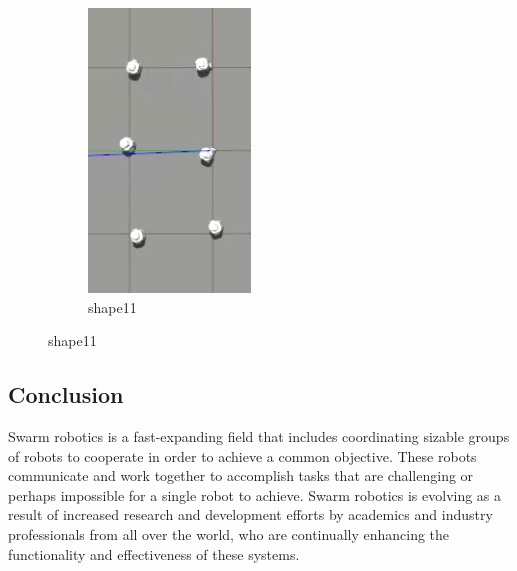 \documentclass[12pt]{extarticle}
\begin{document}
\begin{figure}
\centering
\begin{subfigure}{.5\textwidth}
  \centering
  \includegraphics[width=.6\linewidth]{shape11}
  \caption{shape11}
  \label{fig:sub1}
\end{subfigure}%



\end{figure}



\afterpage{\clearpage}
 \newpage
\pagebreak
\hspace{0pt}
\vfill
\begin{center}
\section{Conclusion}
\end{center}
\vfill
\hspace{0pt}

\pagebreak




Swarm robotics is a fast-expanding field that includes coordinating sizable groups of robots to cooperate in order to achieve a common objective. These robots communicate and work together to accomplish tasks that are challenging or perhaps impossible for a single robot to achieve. Swarm robotics is evolving as a result of increased research and development efforts by academics and industry professionals from all over the world, who are continually enhancing the functionality and effectiveness of these systems.
\end{document}
